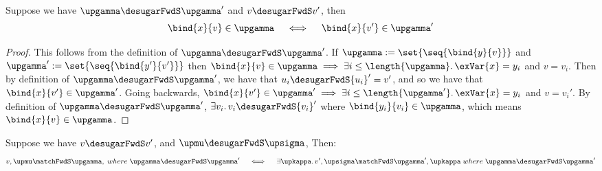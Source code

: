 \begin{lemma}
   \label{lemma:varlookup}
   Suppose we have $\upgamma \desugarFwdS \upgamma'$ and $v \desugarFwdS v'$, then
   $$
      \bind{x}{v} \in \upgamma \quad \iff \quad \bind{x}{v'} \in \upgamma'
   $$
\end{lemma}
\begin{proof}
   This follows from the definition of $\upgamma \desugarFwdS \upgamma'$. If $\upgamma := \set{\seq{\bind{y}{v}}}$ and
   $\upgamma' := \set{\seq{\bind{y'}{v'}}}$ then $\bind{x}{v} \in \upgamma \implies \exists i \le \length{\upgamma}. \, \exVar{x} = y_i$ and $v = v_i$.
   Then by definition of $\upgamma \desugarFwdS \upgamma'$, we have that $u_i \desugarFwdS {u_i}' = v'$, and so we have that $\bind{x}{v'} \in \upgamma'$.
   Going backwards, $\bind{x}{v'} \in \upgamma' \implies \exists i \le \length{\upgamma'}. \, \exVar{x} = y_i$ and $v = {v_i}'$. By definition of
   $\upgamma \desugarFwdS \upgamma'$, $\exists v_i.\, v_i \desugarFwdS {v_i}'$ where $\bind{y_i}{v_i} \in \upgamma$, which means $\bind{x}{v} \in \upgamma$.
\end{proof}
\begin{lemma}
   \label{lemma:matching-bi}
   Suppose we have $v \desugarFwdS v'$, and $\upmu \desugarFwdS \upsigma$, Then:
   $$
      v, \upmu \matchFwdS \upgamma, \; where \; \upgamma \desugarFwdS \upgamma' \quad \iff \quad \exists \upkappa.\, v',\upsigma \matchFwdS \upgamma', \upkappa \; where \; \upgamma \desugarFwdS \upgamma'
   $$
\end{lemma}




